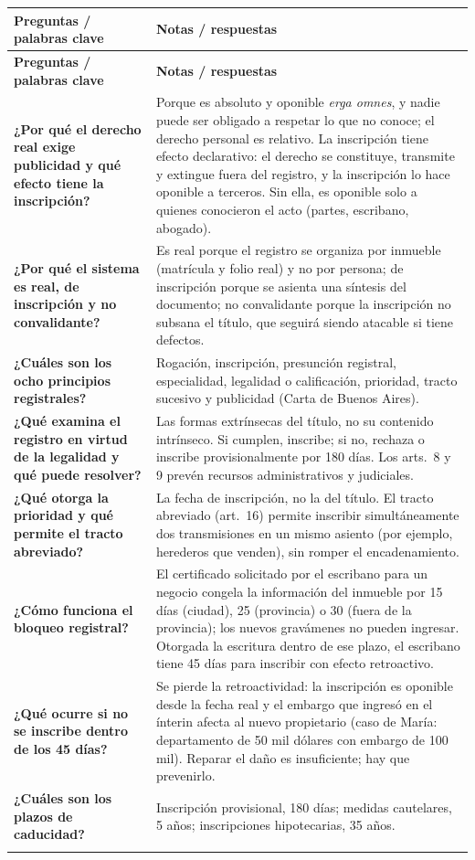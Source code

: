 \documentclass[12pt,oneside]{book}
\makeatletter
\renewcommand{\arraystretch}{1.25}
\newcommand{\cq}[2]{\textbf{#1} & #2 \\[0.45em]}
\newcommand{\cornell}[3]{%
\par\bigskip\noindent{\large\bfseries Cuadro Cornell: #1}\par\nopagebreak\smallskip
\begingroup
\small
\renewcommand{\arraystretch}{1.15}
\begin{longtable}{@{}>{\raggedright\arraybackslash}p{0.26\textwidth}>{\raggedright\arraybackslash}p{0.66\textwidth}@{}}
\toprule
\textbf{Preguntas / palabras clave} & \textbf{Notas / respuestas} \\
\midrule
\endfirsthead
\toprule
\textbf{Preguntas / palabras clave} & \textbf{Notas / respuestas} \\
\midrule
\endhead
#2
\midrule
\multicolumn{2}{@{}p{\dimexpr0.92\textwidth+2\tabcolsep\relax}@{}}{\vspace{0.2em}\textbf{Resumen.} #3\vspace{0.2em}} \\
\bottomrule
\end{longtable}
\endgroup
}
\makeatother
\begin{document}
\cornell{publicidad registral inmobiliaria}{
\cq{¿Por qué el derecho real exige publicidad y qué efecto tiene la inscripción?}{Porque es absoluto y oponible \textit{erga omnes}, y nadie puede ser obligado a respetar lo que no conoce; el derecho personal es relativo. La inscripción tiene efecto declarativo: el derecho se constituye, transmite y extingue fuera del registro, y la inscripción lo hace oponible a terceros. Sin ella, es oponible solo a quienes conocieron el acto (partes, escribano, abogado).}
\cq{¿Por qué el sistema es real, de inscripción y no convalidante?}{Es real porque el registro se organiza por inmueble (matrícula y folio real) y no por persona; de inscripción porque se asienta una síntesis del documento; no convalidante porque la inscripción no subsana el título, que seguirá siendo atacable si tiene defectos.}
\cq{¿Cuáles son los ocho principios registrales?}{Rogación, inscripción, presunción registral, especialidad, legalidad o calificación, prioridad, tracto sucesivo y publicidad (Carta de Buenos Aires).}
\cq{¿Qué examina el registro en virtud de la legalidad y qué puede resolver?}{Las formas extrínsecas del título, no su contenido intrínseco. Si cumplen, inscribe; si no, rechaza o inscribe provisionalmente por 180 días. Los arts.~8 y 9 prevén recursos administrativos y judiciales.}
\cq{¿Qué otorga la prioridad y qué permite el tracto abreviado?}{La fecha de inscripción, no la del título. El tracto abreviado (art.~16) permite inscribir simultáneamente dos transmisiones en un mismo asiento (por ejemplo, herederos que venden), sin romper el encadenamiento.}
\cq{¿Cómo funciona el bloqueo registral?}{El certificado solicitado por el escribano para un negocio congela la información del inmueble por 15 días (ciudad), 25 (provincia) o 30 (fuera de la provincia); los nuevos gravámenes no pueden ingresar. Otorgada la escritura dentro de ese plazo, el escribano tiene 45 días para inscribir con efecto retroactivo.}
\cq{¿Qué ocurre si no se inscribe dentro de los 45 días?}{Se pierde la retroactividad: la inscripción es oponible desde la fecha real y el embargo que ingresó en el ínterin afecta al nuevo propietario (caso de María: departamento de 50 mil dólares con embargo de 100 mil). Reparar el daño es insuficiente; hay que prevenirlo.}
\cq{¿Cuáles son los plazos de caducidad?}{Inscripción provisional, 180 días; medidas cautelares, 5 años; inscripciones hipotecarias, 35 años.}
}{Los derechos reales inmobiliarios son absolutos y oponibles \textit{erga omnes}, lo que exige publicidad. La Ley 17.801 establece un sistema registral real, de inscripción y no convalidante, que descansa en ocho principios y cuya inscripción tiene efecto declarativo. El bloqueo registral protege el inmueble durante la vigencia del certificado y, si se inscribe dentro de los 45 días, la inscripción es retroactiva; fuera de ese plazo se pierde la retroactividad. Al profesional le corresponde vigilar estos plazos para prevenir daños irreparables.}
\end{document}
